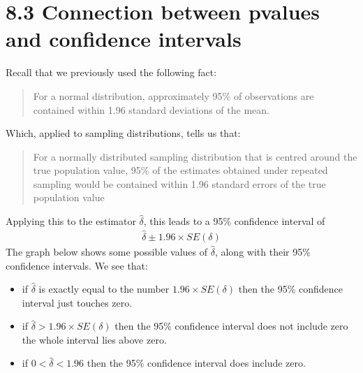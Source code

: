 \documentclass[letterpaper,10pt,english]{jupyterBook}
\begin{document}
\section{8.3 Connection between p\sphinxhyphen{}values and confidence intervals}
\label{\detokenize{08.d. Frequentist II:connection-between-p-values-and-confidence-intervals}}\label{\detokenize{08.d. Frequentist II::doc}}
\sphinxAtStartPar
Recall that we previously used the following fact:
\begin{quote}

\sphinxAtStartPar
For a normal distribution, approximately 95\% of observations are contained within 1.96 standard deviations of the mean.
\end{quote}

\sphinxAtStartPar
Which, applied to sampling distributions, tells us that:
\begin{quote}

\sphinxAtStartPar
For a normally distributed sampling distribution that is centred around the true population value, 95\% of the estimates obtained under repeated sampling would be contained within 1.96 standard errors of the true population value
\end{quote}

\sphinxAtStartPar
Applying this to the estimator \(\hat{\delta}\), this leads to a 95\% confidence interval of
\begin{equation*}
\begin{split}
\hat{\delta} \pm  1.96 \times SE(\delta)
\end{split}
\end{equation*}
\sphinxAtStartPar
The graph below shows some possible values of \(\hat{\delta}\), along with their 95\% confidence intervals. We see that:
\begin{itemize}
\item {} 
\sphinxAtStartPar
if \(\hat{\delta}\) is exactly equal to the number \(1.96 \times  SE(\delta)\) then the 95\% confidence interval just touches zero.

\item {} 
\sphinxAtStartPar
if \(\hat{\delta} > 1.96 \times  SE(\delta)\) then the 95\% confidence interval does not include zero \sphinxhyphen{} the whole interval lies above zero.

\item {} 
\sphinxAtStartPar
if \(0 < \hat{\delta} < 1.96\)  then the 95\% confidence interval does include zero.

\end{itemize}
\end{document}
